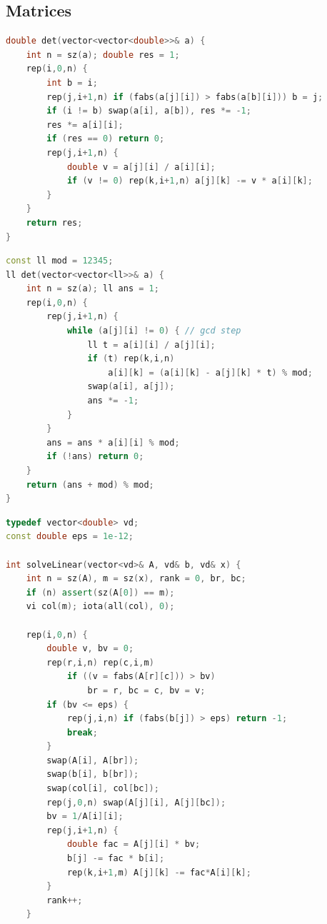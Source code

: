 \begin{multicols}{\Columns}
\subsection{Matrices}
\begin{lstlisting}[language=C++]
double det(vector<vector<double>>& a) {
	int n = sz(a); double res = 1;
	rep(i,0,n) {
		int b = i;
		rep(j,i+1,n) if (fabs(a[j][i]) > fabs(a[b][i])) b = j;
		if (i != b) swap(a[i], a[b]), res *= -1;
		res *= a[i][i];
		if (res == 0) return 0;
		rep(j,i+1,n) {
			double v = a[j][i] / a[i][i];
			if (v != 0) rep(k,i+1,n) a[j][k] -= v * a[i][k];
		}
	}
	return res;
}
\end{lstlisting}

\begin{lstlisting}[language=C++]
const ll mod = 12345;
ll det(vector<vector<ll>>& a) {
	int n = sz(a); ll ans = 1;
	rep(i,0,n) {
		rep(j,i+1,n) {
			while (a[j][i] != 0) { // gcd step
				ll t = a[i][i] / a[j][i];
				if (t) rep(k,i,n)
					a[i][k] = (a[i][k] - a[j][k] * t) % mod;
				swap(a[i], a[j]);
				ans *= -1;
			}
		}
		ans = ans * a[i][i] % mod;
		if (!ans) return 0;
	}
	return (ans + mod) % mod;
}
\end{lstlisting}

\begin{lstlisting}[language=C++]
typedef vector<double> vd;
const double eps = 1e-12;

int solveLinear(vector<vd>& A, vd& b, vd& x) {
	int n = sz(A), m = sz(x), rank = 0, br, bc;
	if (n) assert(sz(A[0]) == m);
	vi col(m); iota(all(col), 0);

	rep(i,0,n) {
		double v, bv = 0;
		rep(r,i,n) rep(c,i,m)
			if ((v = fabs(A[r][c])) > bv)
				br = r, bc = c, bv = v;
		if (bv <= eps) {
			rep(j,i,n) if (fabs(b[j]) > eps) return -1;
			break;
		}
		swap(A[i], A[br]);
		swap(b[i], b[br]);
		swap(col[i], col[bc]);
		rep(j,0,n) swap(A[j][i], A[j][bc]);
		bv = 1/A[i][i];
		rep(j,i+1,n) {
			double fac = A[j][i] * bv;
			b[j] -= fac * b[i];
			rep(k,i+1,m) A[j][k] -= fac*A[i][k];
		}
		rank++;
	}


\end{lstlisting}
\end{multicols}
